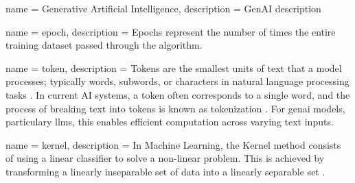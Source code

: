 {
	name =  Generative Artificial Intelligence,
	description = {GenAI description}
}


{
	name = epoch,
	description = {Epochs represent the number of times the entire training dataset passed through the algorithm. \cite{nebius-team2024}}
}

{
	name = token,
	description = {Tokens are the smallest units of text that a model processes; typically words, subwords, or characters in natural language processing tasks \parencite{cser2024}. In current AI systems, a token often corresponds to a single word, and the process of breaking text into tokens is known as tokenization \parencite[59]{jurafsky2009}. For \gls{genai} models, particulary \glspl{llm}, this enables efficient computation across varying text inputs.}
}

{
	name = kernel,
	description = {In Machine Learning, the Kernel method consists of using a linear classifier to solve a non-linear problem. This is achieved by transforming a linearly inseparable set of data into a linearly separable set \parencite{melanie2024}.}
}





